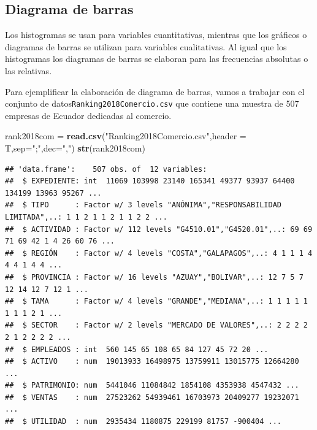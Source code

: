 \documentclass[letterpaper,]{book}
\newenvironment{Shaded}{\begin{snugshade}}{\end{snugshade}}
\newcommand{\DataTypeTok}[1]{\textcolor[rgb]{0.13,0.29,0.53}{#1}}
\newcommand{\KeywordTok}[1]{\textcolor[rgb]{0.13,0.29,0.53}{\textbf{#1}}}
\newcommand{\NormalTok}[1]{#1}
\newcommand{\StringTok}[1]{\textcolor[rgb]{0.31,0.60,0.02}{#1}}
\begin{document}
\newpage

\hypertarget{diagrama-de-barras}{%
\subsection{Diagrama de barras}\label{diagrama-de-barras}}

Los histogramas se usan para variables cuantitativas, mientras que los gráficos o diagramas de barras se utilizan para variables cualitativas. Al igual que los histogramas los diagramas de barras se elaboran para las frecuencias absolutas o las relativas.

Para ejemplificar la elaboración de diagrama de barras, vamos a trabajar con el conjunto de datos\texttt{Ranking2018Comercio.csv} que contiene una muestra de 507 empresas de Ecuador dedicadas al comercio.

\begin{Shaded}
\begin{Highlighting}[]
\NormalTok{rank2018com =}\StringTok{ }\KeywordTok{read.csv}\NormalTok{(}\StringTok{"Ranking2018Comercio.csv"}\NormalTok{,}\DataTypeTok{header =}\NormalTok{ T,}\DataTypeTok{sep=}\StringTok{";"}\NormalTok{,}\DataTypeTok{dec=}\StringTok{","}\NormalTok{)}
\KeywordTok{str}\NormalTok{(rank2018com)}
\end{Highlighting}
\end{Shaded}

\begin{verbatim}
## 'data.frame':    507 obs. of  12 variables:
##  $ EXPEDIENTE: int  11069 103998 23140 165341 49377 93937 64400 134199 13963 95267 ...
##  $ TIPO      : Factor w/ 3 levels "ANÓNIMA","RESPONSABILIDAD LIMITADA",..: 1 1 2 1 1 2 1 1 2 2 ...
##  $ ACTIVIDAD : Factor w/ 112 levels "G4510.01","G4520.01",..: 69 69 71 69 42 1 4 26 60 76 ...
##  $ REGIÓN    : Factor w/ 4 levels "COSTA","GALAPAGOS",..: 4 1 1 1 4 4 4 1 4 4 ...
##  $ PROVINCIA : Factor w/ 16 levels "AZUAY","BOLIVAR",..: 12 7 5 7 12 14 12 7 12 1 ...
##  $ TAMA      : Factor w/ 4 levels "GRANDE","MEDIANA",..: 1 1 1 1 1 1 1 1 2 1 ...
##  $ SECTOR    : Factor w/ 2 levels "MERCADO DE VALORES",..: 2 2 2 2 2 1 2 2 2 2 ...
##  $ EMPLEADOS : int  560 145 65 108 65 84 127 45 72 20 ...
##  $ ACTIVO    : num  19013933 16498975 13759911 13015775 12664280 ...
##  $ PATRIMONIO: num  5441046 11084842 1854108 4353938 4547432 ...
##  $ VENTAS    : num  27523262 54939461 16703973 20409277 19232071 ...
##  $ UTILIDAD  : num  2935434 1180875 229199 81757 -900404 ...
\end{verbatim}
\end{document}
